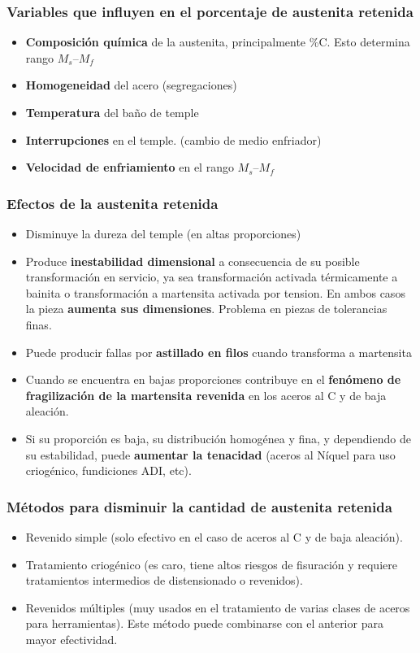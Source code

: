 \documentclass{article}
\begin{document}
\subsubsection{Variables que influyen en el porcentaje de austenita retenida}
\begin{itemize}
    \item \textbf{Composición química} de la austenita, principalmente \%C. Esto determina rango $M_s$--$M_f$
    \item \textbf{Homogeneidad} del acero (segregaciones)
    \item \textbf{Temperatura} del baño de temple
    \item \textbf{Interrupciones} en el temple. (cambio de medio enfriador)
    \item \textbf{Velocidad de enfriamiento} en el rango $M_s$--$M_f$
\end{itemize}

\subsubsection{Efectos de la austenita retenida}
\begin{itemize}
    \item Disminuye la dureza del temple (en altas proporciones)
    \item Produce \textbf{inestabilidad dimensional} a consecuencia de su posible transformación en servicio, ya sea transformación activada térmicamente a bainita o transformación a martensita activada por tension. En ambos casos la pieza \textbf{aumenta sus dimensiones}. Problema en piezas de tolerancias finas.
    \item Puede producir fallas por \textbf{astillado en filos} cuando transforma a martensita
    \item Cuando se encuentra en bajas proporciones contribuye en el \textbf{fenómeno de fragilización de la martensita revenida} en los aceros al C y de baja aleación.
    \item Si su proporción es baja, su distribución homogénea y fina, y dependiendo de su estabilidad, puede \textbf{aumentar la tenacidad} (aceros al Níquel para uso criogénico, fundiciones ADI, etc).
\end{itemize}

\subsubsection{Métodos para disminuir la cantidad de austenita retenida}
\begin{itemize}
    \item Revenido simple (solo efectivo en el caso de aceros al C y de baja aleación).
    \item Tratamiento criogénico (es caro, tiene altos riesgos de fisuración y requiere tratamientos intermedios de distensionado o revenidos).
    \item Revenidos múltiples (muy usados en el tratamiento de varias clases de aceros para herramientas). Este método puede combinarse con el anterior para mayor efectividad.
\end{itemize}
\end{document}
